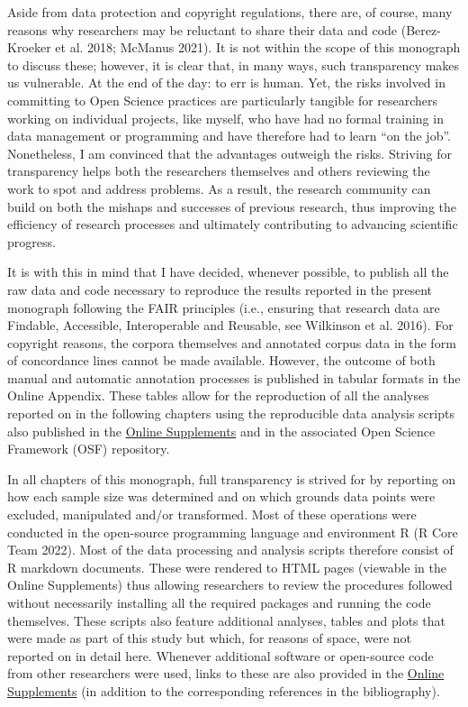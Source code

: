 \documentclass[
  letterpaper,
  DIV=11,
  numbers=noendperiod]{scrreprt}
\begin{document}
Aside from data protection and copyright regulations, there are, of
course, many reasons why researchers may be reluctant to share their
data and code (Berez-Kroeker et al. 2018; McManus 2021). It is not
within the scope of this monograph to discuss these; however, it is
clear that, in many ways, such transparency makes us vulnerable. At the
end of the day: to err is human. Yet, the risks involved in committing
to Open Science practices are particularly tangible for researchers
working on individual projects, like myself, who have had no formal
training in data management or programming and have therefore had to
learn ``on the job''. Nonetheless, I am convinced that the advantages
outweigh the risks. Striving for transparency helps both the researchers
themselves and others reviewing the work to spot and address problems.
As a result, the research community can build on both the mishaps and
successes of previous research, thus improving the efficiency of
research processes and ultimately contributing to advancing scientific
progress.

It is with this in mind that I have decided, whenever possible, to
publish all the raw data and code necessary to reproduce the results
reported in the present monograph following the FAIR principles (i.e.,
ensuring that research data are Findable, Accessible, Interoperable and
Reusable, see Wilkinson et al. 2016). For copyright reasons, the corpora
themselves and annotated corpus data in the form of concordance lines
cannot be made available. However, the outcome of both manual and
automatic annotation processes is published in tabular formats in the
Online Appendix. These tables allow for the reproduction of all the
analyses reported on in the following chapters using the reproducible
data analysis scripts also published in the
\href{https://elenlefoll.github.io/TextbookMDA}{Online Supplements} and
in the associated Open Science Framework (OSF) repository.

In all chapters of this monograph, full transparency is strived for by
reporting on how each sample size was determined and on which grounds
data points were excluded, manipulated and/or transformed. Most of these
operations were conducted in the open-source programming language and
environment R (R Core Team 2022). Most of the data processing and
analysis scripts therefore consist of R markdown documents. These were
rendered to HTML pages (viewable in the Online Supplements) thus
allowing researchers to review the procedures followed without
necessarily installing all the required packages and running the code
themselves. These scripts also feature additional analyses, tables and
plots that were made as part of this study but which, for reasons of
space, were not reported on in detail here. Whenever additional software
or open-source code from other researchers were used, links to these are
also provided in the
\href{https://elenlefoll.github.io/TextbookMDA}{Online Supplements} (in
addition to the corresponding references in the bibliography).
\end{document}
